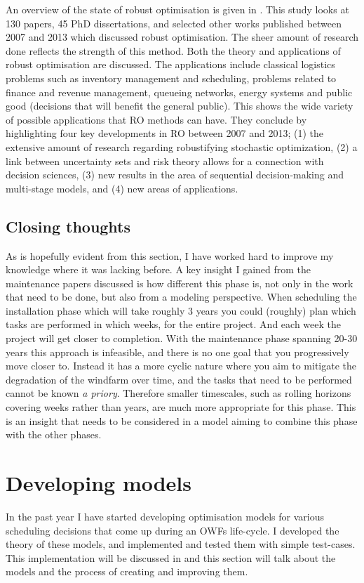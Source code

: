 \documentclass[a4paper,12pt]{article}
\begin{document}
An overview of the state of robust optimisation is given in \cite{gabrel2014recent}. This study looks at 130 papers, 45 PhD dissertations, and selected other works published between 2007 and 2013 which discussed robust optimisation. The sheer amount of research done reflects the strength of this method. Both the theory and applications of robust optimisation are discussed. The applications include classical logistics problems such as inventory management and scheduling, problems related to finance and revenue management, queueing networks, energy systems and public good (decisions that will benefit the general public). This shows the wide variety of possible applications that RO methods can have. They conclude by highlighting four key developments in RO between 2007 and 2013; (1) the extensive amount of research regarding robustifying stochastic optimization, (2) a link between uncertainty sets and risk theory allows for a connection with decision sciences, (3) new results in the area of sequential decision-making and multi-stage models, and (4) new areas of applications. 

\subsection{Closing thoughts} \label{ss:clotho}
As is hopefully evident from this section, I have worked hard to improve my knowledge where it was lacking before. A key insight I gained from the maintenance papers discussed is how different this phase is, not only in the work that need to be done, but also from a modeling perspective. When scheduling the installation phase which will take roughly 3 years you could (roughly) plan which tasks are performed in which weeks, for the entire project. And each week the project will get closer to completion. With the maintenance phase spanning 20-30 years  this approach is infeasible, and there is no one goal that you progressively move closer to. Instead it has a more cyclic nature where you aim to mitigate the degradation of the windfarm over time, and the tasks that need to be performed cannot be known \emph{a priory}. Therefore smaller timescales, such as rolling horizons covering weeks rather than years, are much more appropriate for this phase. This is an insight that needs to be considered in a model aiming to combine this phase with the other phases. 

\pagebreak

\section{Developing models}\label{s:model}
In the past year I have started developing optimisation models for various scheduling decisions that come up during an OWFs life-cycle. I developed the theory of these models, and implemented and tested them with simple test-cases. This implementation will be discussed in  and this section will talk about the models and the process of creating and improving them. 
\end{document}
